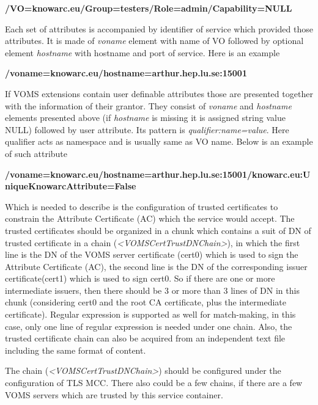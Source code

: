 \documentclass{article}
\begin{document}
{\bfseries\color{black}
/VO=knowarc.eu/Group=testers/Role=admin/Capability=NULL}

{\color{black}
Each set of attributes is accompanied by identifier of service which
provided those attributes. It is made of \textit{voname} element with
name of VO followed by optional element \textit{hostname} with hostname
and port of service. Here is an example}

{\bfseries\color{black}
/voname=knowarc.eu/hostname=arthur.hep.lu.se:15001}

{\color{black}
If VOMS extensions contain user definable attributes those are presented
together with the information of their grantor. They consist of
\textit{voname} and \textit{hostname} elements presented above (if
\textit{hostname} is missing it is assigned string value NULL) followed
by user attribute. It{\textquotesingle}s pattern is
\textit{qualifier:name=value}. Here qualifier acts as namespace and is
usually same as VO name. Below is an example of such attribute}

{\bfseries\color{black}
/voname=knowarc.eu/hostname=arthur.hep.lu.se:15001/knowarc.eu:UniqueKnowarcAttribute=False}

{\color{black}
Which is needed to describe is the configuration of trusted certificates
to constrain the Attribute Certificate (AC) which the service would
accept. The trusted certificates should be organized in a chunk which
contains a suit of DN of trusted certificate in a chain
(\textit{{\textless}VOMSCertTrustDNChain{\textgreater}}), in which the
first line is the DN of the VOMS server certificate (cert0) which is
used to sign the Attribute Certificate (AC), the second line is the DN
of the corresponding issuer certificate(cert1) which is used to sign
cert0. So if there are one or more intermediate issuers, then there
should be 3 or more than 3 lines of DN in this chunk (considering cert0
and the root CA certificate, plus the intermediate certificate).
Regular expression is supported as well for match-making, in this case,
only one line of regular expression is needed under one chain. Also,
the trusted certificate chain can also be acquired from an independent
text file including the same format of content.}

{\color{black}
The chain (\textit{{\textless}VOMSCertTrustDNChain{\textgreater}})
should be configured under the configuration of TLS MCC. There also
could be a few chains, if there are a few VOMS servers which are
trusted by this service container.}
\end{document}
